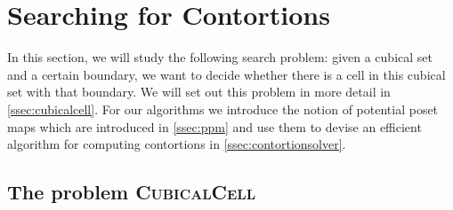 \documentclass{llncs}
\newcommand{\todo}[1]{
  \begin{tcolorbox}
    TODO {#1} 
  \end{tcolorbox}
}
\newcommand{\myproblem}[1]{\textsc{{#1}}}
\newcommand{\pint}[1]{\mathbf{1}^{#1}}
\renewcommand{\dim}[1]{\mathsf{dim}({#1})}
\newcommand{\cont}[2]{\ensuremath{ \ifthenelse{\equal{#2}{}}{#1}{{#1}\langle{#2}\rangle}} }
\newcommand{\boundary}[1]{\partial({#1})}
\newcommand{\comp}[2]{\mathsf{Comp}({#1}\ {#2})}
\begin{document}







\section{Searching for Contortions}
\label{sec:contortionsolver}

In this section, we will study the following search problem: given a cubical set
and a certain boundary, we want to decide whether there is a cell in this
cubical set with that boundary. We will set out this problem in more detail in
\autoref{ssec:cubicalcell}. For our algorithms we introduce the notion of
potential poset maps which are introduced in \autoref{ssec:ppm} and use them to
devise an efficient algorithm for computing contortions in
\autoref{ssec:contortionsolver}. 


\subsection{The problem \myproblem{CubicalCell}}
\label{ssec:cubicalcell}
\end{document}
